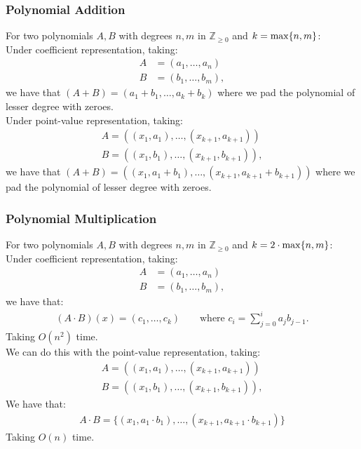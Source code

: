 \subsubsection{Polynomial Addition}

For two polynomials $A, B$ with degrees $n, m$ in $\mathbb{Z}_{\geq 0}$
and $k = \operatorname{max}\{n, m\}$:
\\[\baselineskip]
Under coefficient representation, taking: \begin{align*}
    A &= (a_1, \ldots, a_n) \\
    B &= (b_1, \ldots, b_m),
\end{align*} we have that $(A + B) = (a_1 + b_1, \ldots, a_k + b_k)$
where we pad the polynomial of lesser degree with zeroes.
\\[\baselineskip]
Under point-value representation, taking: \begin{align*}
    A = ((x_1, a_1), \ldots, (x_{k + 1}, a_{k + 1})) \\
    B = ((x_1, b_1), \ldots, (x_{k + 1}, b_{k + 1})),
\end{align*} we have that $(A + B) = ((x_1, a_1 + b_1), 
\ldots, (x_{k + 1}, a_{k + 1} + b_{k + 1}))$ where we pad the polynomial 
of lesser degree with zeroes.

\subsubsection{Polynomial Multiplication}

For two polynomials $A, B$ with degrees $n, m$ in $\mathbb{Z}_{\geq 0}$
and $k = 2 \cdot \operatorname{max}\{n, m\}$:
\\[\baselineskip]
Under coefficient representation, taking: \begin{align*}
    A &= (a_1, \ldots, a_n) \\
    B &= (b_1, \ldots, b_m),
\end{align*} we have that: \begin{gather*}
  (A \cdot B)(x) = (c_1, \ldots, c_k) \qquad \text{where }
  c_i = \sum_{j = 0}^ia_jb_{j - 1}.
\end{gather*} Taking $O(n^2)$ time.
\\[\baselineskip]
We can do this with the point-value representation, taking: \begin{align*}
    A = ((x_1, a_1), \ldots, (x_{k + 1}, a_{k + 1})) \\
    B = ((x_1, b_1), \ldots, (x_{k + 1}, b_{k + 1})),
\end{align*} We have that: \begin{gather*}
  A \cdot B = \{(x_1, a_1 \cdot b_1), \ldots, (x_{k + 1}, a_{k + 1} \cdot b_{k + 1})\}
\end{gather*} Taking $O(n)$ time.

